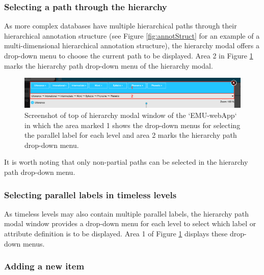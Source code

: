\documentclass[]{book}
\begin{document}
\hypertarget{selecting-a-path-through-the-hierarchy}{%
\subsubsection{Selecting a path through the hierarchy}\label{selecting-a-path-through-the-hierarchy}}

As more complex databases have multiple hierarchical paths through their hierarchical annotation structure (see Figure \ref{fig:annotStruct} for an example of a multi-dimensional hierarchical annotation structure), the hierarchy modal offers a drop-down menu to choose the current path to be displayed. Area 2 in Figure \ref{fig:webApp-hierModalTop} marks the hierarchy path drop-down menu of the hierarchy modal.

\begin{figure}

{\centering \includegraphics[width=0.85\linewidth]{pics/emu-webAppHierModalTop} 

}

\caption{Screenshot of top of hierarchy modal window of the `EMU-webApp` in which the area marked 1 shows the drop-down menus for selecting the parallel label for each level and area 2 marks the hierarchy path drop-down menu.}\label{fig:webApp-hierModalTop}
\end{figure}

It is worth noting that only non-partial paths can be selected in the hierarchy path drop-down menu.

\hypertarget{selecting-parallel-labels-in-timeless-levels}{%
\subsubsection{Selecting parallel labels in timeless levels}\label{selecting-parallel-labels-in-timeless-levels}}

As timeless levels may also contain multiple parallel labels, the hierarchy path modal window provides a drop-down menu for each level to select which label or attribute definition is to be displayed. Area 1 of Figure \ref{fig:webApp-hierModalTop} displays these drop-down menus.

\hypertarget{adding-a-new-item}{%
\subsubsection{Adding a new item}\label{adding-a-new-item}}
\end{document}
